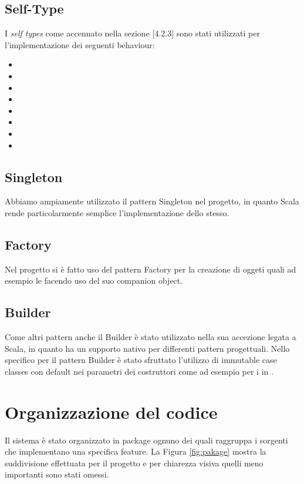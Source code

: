 \subsection{Self-Type}
I \textit{self types} come accennato nella sezione [4.2.3] sono stati utilizzati per l'implementazione dei seguenti behaviour:
\begin{itemize}
    \item {}
    \item {}
    \item {}
    \item {}
    \item {}
    \item {}
    \item {}
    \item {}
\end{itemize}
\subsection{Singleton}
Abbiamo ampiamente utilizzato il pattern Singleton nel progetto, in quanto Scala rende particolarmente semplice l’implementazione dello stesso.
\subsection{Factory}
Nel progetto si è fatto uso del pattern Factory per la creazione di oggeti quali ad esempio le  facendo uso del suo companion object.
\subsection{Builder}
Come altri pattern anche il Builder è stato utilizzato nella sua accezione legata a Scala, in quanto ha un supporto nativo per differenti pattern progettuali. Nello specifico per il pattern Builder è stato sfruttato l’utilizzo di immutable case classes con default nei parametri dei costruttori come ad esempio per i  in .

\section{Organizzazione del codice}
Il sistema è stato organizzato in package ognuno dei quali raggruppa i sorgenti che implementano una specifica feature. La Figura \ref{fig:pakage} mostra la suddivisione effettuata per il progetto e per chiarezza visiva quelli meno importanti sono stati omessi.

